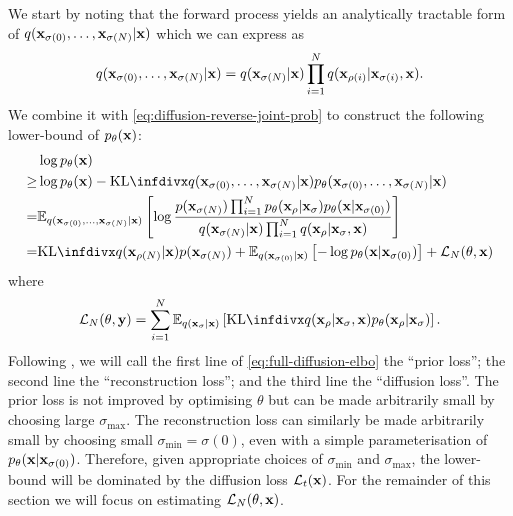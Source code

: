 We start by noting that the forward process yields an analytically tractable form of $q({\mathbf{x}}_{\sigma(0)},\ldots,{\mathbf{x}}_{\sigma(N)}|{\mathbf{x}})$ which we can express as
\begin{equation}
    q({\mathbf{x}}_{\sigma(0)},\ldots,{\mathbf{x}}_{\sigma(N)}|{\mathbf{x}}) = q({\mathbf{x}}_{\sigma(N)}|{\mathbf{x}}) \prod_{i=1}^N q({\mathbf{x}}_{\rho(i)} | {\mathbf{x}}_{\sigma(i)}, {\mathbf{x}}).
\end{equation}We combine it with \cref{eq:diffusion-reverse-joint-prob} to construct the following lower-bound of $p_\theta({\mathbf{x}})$:
\begin{align}
    &\log p_\theta(\rvx) \\
    \geq &\log p_\theta(\rvx) - \kl{q(\rvx_{\sigma(0)},\ldots,\rvx_{\sigma(N)}|\rvx)}{p_\theta(\rvx_{\sigma(0)},\ldots,\rvx_{\sigma(N)}|\rvx)} \\
    = &\EX_{q(\rvx_{\sigma(0)},\ldots,\rvx_{\sigma(N)}|\rvx)} \left[ \log \frac{p(\rvx_{\sigma(N)}) \prod_{i=1}^N p_\theta(\rvx_{\rho} | \rvx_{\sigma}) p_\theta(\rvx|\rvx_{\sigma(0)}) }{q(\rvx_{\sigma(N)}|\rvx) \prod_{i=1}^N q(\rvx_{\rho} | \rvx_{\sigma}, \rvx)} \right] \\
    = &\kl{q(\rvx_{\rho(N)}|\rvx)}{p(\rvx_{\sigma(N)})} + \EX_{q(\rvx_{\sigma(0)}|\rvx)} \left[ - \log p_\theta(\rvx|\rvx_{\sigma(0)}) \right] + \mathcal{L}_N(\theta, \rvx) \label{eq:full-diffusion-elbo}
\end{align}
where
\begin{align}
    \mathcal{L}_N(\theta, \rvy) = \sum_{i=1}^N \EX_{q(\rvx_{\sigma}|\rvx)} \left[ \kl{q(\rvx_{\rho} | \rvx_{\sigma}, \rvx)}{p_\theta(\rvx_{\rho} | \rvx_{\sigma})} \right].
\end{align}
Following \citet{kingma2021variational}, we will call the first line of \cref{eq:full-diffusion-elbo} the ``prior loss''; the second line the ``reconstruction loss''; and the third line the ``diffusion loss''. The prior loss is not improved by optimising $\theta$ but can be made arbitrarily small by choosing large $\sigma_\text{max}$. The reconstruction loss can similarly be made arbitrarily small by choosing small $\sigma_\text{min}=\sigma(0)$, even with a simple parameterisation of $p_\theta({\mathbf{x}}|{\mathbf{x}}_{\sigma(0)})$. Therefore, given appropriate choices of $\sigma_\text{min}$ and $\sigma_\text{max}$, the lower-bound will be dominated by the diffusion loss $\mathcal{L}_t({\mathbf{x}})$. For the remainder of this section we will focus on estimating $\mathcal{L}_N(\theta, {\mathbf{x}})$.

